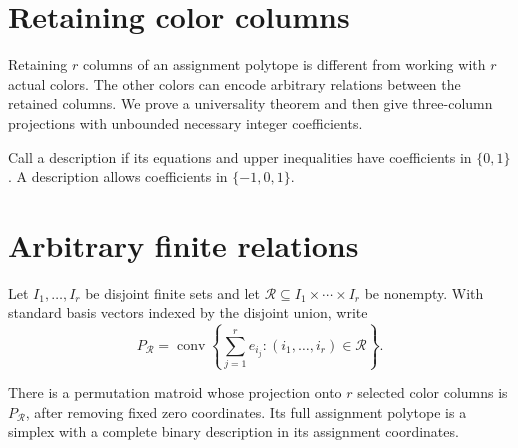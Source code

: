 
\section[columnProjections]{Retaining color columns}

Retaining $r$ columns of an assignment polytope is different from working
with $r$ actual colors. The other colors can encode arbitrary relations
between the retained columns. We prove a universality theorem and then
give three-column projections with unbounded necessary integer coefficients.

Call a description  if its equations and upper
inequalities have coefficients in $\{0,1\}$. A 
description allows coefficients in $\{-1,0,1\}$.

\section[projectionUniversality]{Arbitrary finite relations}

Let $I_1,\dotsc,I_r$ be disjoint finite sets and let
$\mathcal R\subseteq I_1\times\dotsb\times I_r$ be nonempty. With
standard basis vectors indexed by the disjoint union, write
\[
 P_{\mathcal R}=
 \operatorname{conv}\left\{\sum_{j=1}^r e_{i_j}:
 (i_1,\dotsc,i_r)\in\mathcal R\right\}.
\]

\begin{theorem}
There is a permutation matroid whose projection onto $r$ selected
color columns is $P_{\mathcal R}$, after removing fixed zero coordinates.
Its full assignment polytope is a simplex with a complete binary
description in its assignment coordinates.
\end{theorem}


